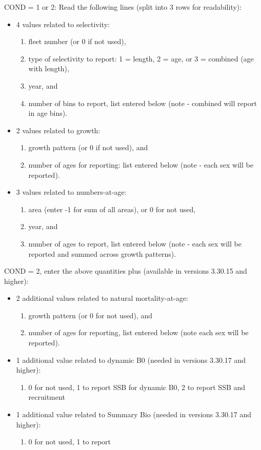COND = 1 or 2: Read the following lines (split into 3 rows for readability):
\begin{itemize}
	\item 4 values related to selectivity:
	\begin{enumerate}
		\item fleet number (or 0 if not used),
		\item type of selectivity to report: 1 = length, 2 = age, or 3 = combined (age with length),
		\item year, and
		\item number of bins to report, list entered below (note - combined will report in age bins).
	\end{enumerate}	
	\item 2 values related to growth:
	\begin{enumerate}
		\item growth pattern (or 0 if not used), and
		\item number of ages for reporting: list entered below (note - each sex will be reported).
	\end{enumerate}	
	\item 3 values related to numbers-at-age:
	\begin{enumerate}
		\item area (enter -1 for sum of all areas), or 0 for not used,
		\item year, and
		\item number of ages to report, list entered below (note - each sex will be reported and summed across growth patterns).
	\end{enumerate}
\end{itemize}

COND = 2, enter the above quantities plus (available in versions 3.30.15 and higher):  
\begin{itemize}
	\item 2 additional values related to natural mortality-at-age:
	\begin{enumerate}
		\item growth pattern (or 0 for not used), and
		\item number of ages for reporting, list entered below (note each sex will be reported).
	\end{enumerate}
	\item 1 additional value related to dynamic B0 (needed in versions 3.30.17 and higher):
	\begin{enumerate}
		\item 0 for not used, 1 to report SSB for dynamic B0, 2 to report SSB and recruitment
	\end{enumerate}
	\item 1 additional value related to Summary Bio (needed in versions 3.30.17 and higher):
	   \begin{enumerate}
	     \item 0 for not used, 1 to report
	   \end{enumerate}
	   
\end{itemize}


